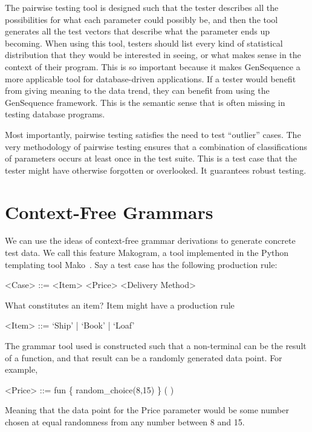 The pairwise testing tool is designed such that the tester describes all the possibilities for what each parameter could possibly be, and then the tool generates all the test vectors that describe what the parameter ends up becoming. When using this tool, testers should list every kind of statistical distribution that they would be interested in seeing, or what makes sense in the context of their program. This is so important because it makes GenSequence a more applicable tool for database-driven applications. If a tester would benefit from giving meaning to the data trend, they can benefit from using the GenSequence framework. This is the semantic sense that is often missing in testing database programs.

Most importantly, pairwise testing satisfies the need to test ``outlier'' cases. The very methodology of pairwise testing ensures that a combination of classifications of parameters occurs at least once in the test suite. This is a test case that the tester might have otherwise forgotten or overlooked. It guarantees robust testing.

\section{Context-Free Grammars}
We can use the ideas of context-free grammar derivations to generate concrete test data. We call this feature Makogram, a tool implemented in the Python templating tool Mako~\cite{Mako:Template}. Say a test case has the following production rule:

\begin{grammar}
<Case> ::= <Item> <Price> <Delivery Method>
\end{grammar}

What constitutes an item? Item might have a production rule 
\begin{grammar}
<Item> ::= `Ship' | `Book' | `Loaf'
\end{grammar}

The grammar tool used is constructed such that a non-terminal can be the result of a function, and that result can be a randomly generated data point. For example,

\begin{grammar}
<Price> ::= fun \{ random_choice(8,15) \} ( )
\end{grammar}

Meaning that the data point for the Price parameter would be some number chosen at equal randomness from any number between 8 and 15.

